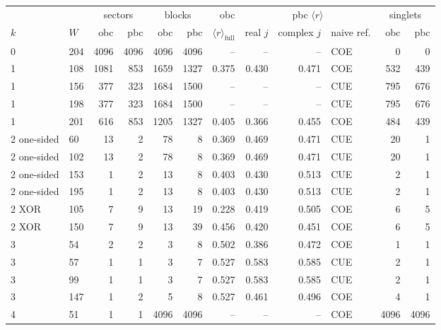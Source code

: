 \begin{tabular}{llrrrrrrrlrr}
\toprule
 & & \multicolumn{2}{c}{sectors} & \multicolumn{2}{c}{blocks} & obc & \multicolumn{3}{c}{pbc $\langle r\rangle$} & \multicolumn{2}{c}{singlets} \\
$k$ & $W$ & obc & pbc & obc & pbc & $\langle r\rangle_\mathrm{full}$ & real $j$ & complex $j$ & naive ref. & obc & pbc \\
\midrule
0 & 204 & 4096 & 4096 & 4096 & 4096 & -- & -- & -- & COE & 0 & 0 \\
1 & 108 & 1081 & 853 & 1659 & 1327 & 0.375 & 0.430 & 0.471 & COE & 532 & 439 \\
1 & 156 & 377 & 323 & 1684 & 1500 & -- & -- & -- & CUE & 795 & 676 \\
1 & 198 & 377 & 323 & 1684 & 1500 & -- & -- & -- & CUE & 795 & 676 \\
1 & 201 & 616 & 853 & 1205 & 1327 & 0.405 & 0.366 & 0.455 & COE & 484 & 439 \\
2 one-sided & 60 & 13 & 2 & 78 & 8 & 0.369 & 0.469 & 0.471 & CUE & 20 & 1 \\
2 one-sided & 102 & 13 & 2 & 78 & 8 & 0.369 & 0.469 & 0.471 & CUE & 20 & 1 \\
2 one-sided & 153 & 1 & 2 & 13 & 8 & 0.403 & 0.430 & 0.513 & CUE & 2 & 1 \\
2 one-sided & 195 & 1 & 2 & 13 & 8 & 0.403 & 0.430 & 0.513 & CUE & 2 & 1 \\
2 XOR & 105 & 7 & 9 & 13 & 19 & 0.228 & 0.419 & 0.505 & COE & 6 & 5 \\
2 XOR & 150 & 7 & 9 & 13 & 39 & 0.456 & 0.420 & 0.451 & COE & 6 & 5 \\
3 & 54 & 2 & 2 & 3 & 8 & 0.502 & 0.386 & 0.472 & COE & 1 & 1 \\
3 & 57 & 1 & 1 & 3 & 7 & 0.527 & 0.583 & 0.585 & CUE & 2 & 1 \\
3 & 99 & 1 & 1 & 3 & 7 & 0.527 & 0.583 & 0.585 & CUE & 2 & 1 \\
3 & 147 & 1 & 2 & 5 & 8 & 0.527 & 0.461 & 0.496 & COE & 4 & 1 \\
4 & 51 & 1 & 1 & 4096 & 4096 & -- & -- & -- & COE & 4096 & 4096 \\
\bottomrule
\end{tabular}
